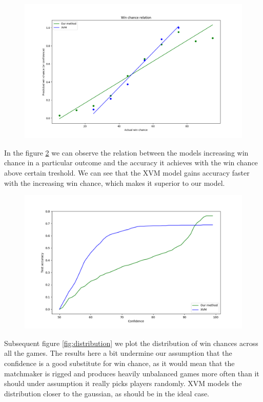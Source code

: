 \documentclass{report}
\begin{document}
\begin{figure}[H]
\hspace{-80pt}
  \includegraphics[width=500px]{confidence_to_chance.png}
  \label{fig:chance}
\end{figure}

In the figure \ref{fig:confidence} we can observe the relation between the models increasing win chance in a particular outcome and the accuracy it achieves with the win chance above certain treshold.
We can see that the XVM model gains accuracy faster with the increasing win chance, which makes it superior to our model.

\begin{figure}[H]
\hspace{-80pt}
  \includegraphics[width=500px]{confidence_to_accuracy.png}
  \label{fig:confidence}
\end{figure}

Subsequent figure \ref{fig:distribution} we plot the distribution of win chances across all the games.
The results here a bit undermine our assumption that the confidence is a good substitute for win chance, as it would mean that the matchmaker is rigged and produces heavily unbalanced games more often than it should under assumption it really picks players randomly. XVM models the distribution closer to the gaussian, as should be in the ideal case.
\end{document}
